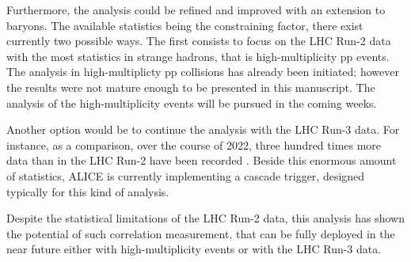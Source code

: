 Furthermore, the analysis could be refined and improved with an extension to \rmOmegaPM baryons. The available statistics being the constraining factor, there exist currently two possible ways. The first consists to focus on the LHC Run-2 data with the most statistics in strange hadrons, that is high-multiplicity pp events. The analysis in high-multiplicty pp collisions has already been initiated; however the results were not mature enough to be presented in this manuscript. The analysis of the high-multiplicity events will be pursued in the coming weeks.

Another option would be to continue the analysis with the LHC Run-3 data. For instance, as a comparison, over the course of 2022, three hundred times more data than in the LHC Run-2 have been recorded \cite{cern152ndLHCCMeeting2022}. Beside this enormous amount of statistics, ALICE is currently implementing a cascade trigger, designed typically for this kind of analysis. 

Despite the statistical limitations of the LHC Run-2 data, this analysis has shown the potential of such correlation measurement, that can be fully deployed in the near future either with high-multiplicity events or with the LHC Run-3 data.



